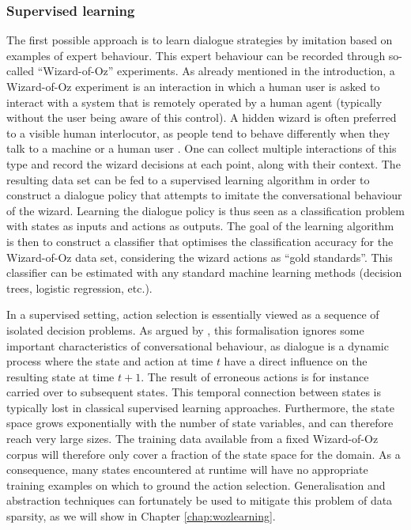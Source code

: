 \subsubsection*{Supervised learning}

The first possible approach is to learn dialogue strategies by imitation based on examples of expert behaviour.  This expert behaviour can be recorded through so-called ``Wizard-of-Oz'' experiments.  As already mentioned in the introduction, a Wizard-of-Oz experiment is an interaction in which a human user is asked to interact with a system that is remotely operated by a human agent (typically without the user being aware of this control).  A hidden wizard is often preferred to a visible human interlocutor, as people tend to behave differently when they talk to a machine or a human user \citep{JonnsonD88}.  One can collect multiple interactions of this type and record the wizard decisions at each point, along with their context.   The resulting data set can be fed to a supervised learning algorithm in order to construct a dialogue policy that attempts to imitate the conversational behaviour of the wizard.  Learning the dialogue policy is thus seen as a classification problem with states as inputs and actions as outputs. The goal of the learning algorithm is then to construct a classifier  that optimises the classification accuracy for the Wizard-of-Oz data set, considering the wizard actions as ``gold standards''.  This classifier can be estimated with any standard machine learning methods (decision trees, logistic regression, etc.).
 
In a supervised setting, action selection is essentially viewed as a sequence of isolated decision problems.  As argued by \cite{817450}, this formalisation ignores some important characteristics of conversational behaviour, as dialogue is a dynamic process where the state and action at time $t$ have a direct influence on the resulting state at time $t+1$.  The result of erroneous actions is for instance carried over to subsequent states. This temporal connection between states is typically lost in classical supervised learning approaches. Furthermore, the state space grows exponentially with the number of state variables, and can therefore reach very large sizes.  The training data available from a fixed Wizard-of-Oz corpus will therefore only cover a fraction of the state space for the domain.  As a consequence, many states encountered at runtime will have no appropriate training examples on which to ground the action selection.  Generalisation and abstraction techniques can fortunately be used to mitigate this problem of data sparsity, as we will show in Chapter \ref{chap:wozlearning}.

